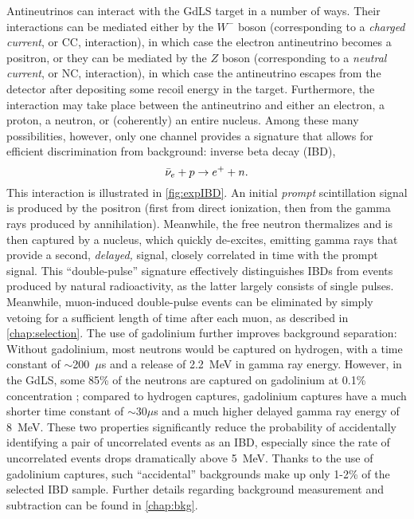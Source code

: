 \documentclass[../thesis.tex]{subfiles}
\begin{document}
Antineutrinos can interact with the GdLS target in a number of ways. Their interactions can be mediated either by the $W^-$ boson (corresponding to a \emph{charged current}, or CC, interaction), in which case the electron antineutrino becomes a positron, or they can be mediated by the $Z$ boson (corresponding to a \emph{neutral current}, or NC, interaction), in which case the antineutrino escapes from the detector after depositing some recoil energy in the target. Furthermore, the interaction may take place between the antineutrino and either an electron, a proton, a neutron, or (coherently) an entire nucleus. Among these many possibilities, however, only one channel provides a signature that allows for efficient discrimination from background: inverse beta decay (IBD),
\begin{equation}
  \bar\nu_e + p \rightarrow e^+ + n.
\end{equation}
This interaction is illustrated in \autoref{fig:expIBD}. An initial \emph{prompt} scintillation signal is produced by the positron (first from direct ionization, then from the gamma rays produced by annihilation). Meanwhile, the free neutron thermalizes and is then captured by a nucleus, which quickly de-excites, emitting gamma rays that provide a second, \emph{delayed,} signal, closely correlated in time with the prompt signal. This ``double-pulse'' signature effectively distinguishes IBDs from events produced by natural radioactivity, as the latter largely consists of single pulses. Meanwhile, muon-induced double-pulse events can be eliminated by simply vetoing for a sufficient length of time after each muon, as described in \autoref{chap:selection}. The use of gadolinium further improves background separation: Without gadolinium, most neutrons would be captured on hydrogen, with a time constant of $\sim$200~$\mu$s and a release of 2.2~MeV in gamma ray energy. However, in the GdLS, some 85\% of the neutrons are captured on gadolinium at 0.1\% concentration \cite{spectrum2017}; compared to hydrogen captures, gadolinium captures have a much shorter time constant of $\sim$30$\mu$s and a much higher delayed gamma ray energy of 8~MeV. These two properties significantly reduce the probability of accidentally identifying a pair of uncorrelated events as an IBD, especially since the rate of uncorrelated events drops dramatically above 5~MeV. Thanks to the use of gadolinium captures, such ``accidental'' backgrounds make up only 1-2\% of the selected IBD sample. Further details regarding background measurement and subtraction can be found in \autoref{chap:bkg}.
\end{document}

